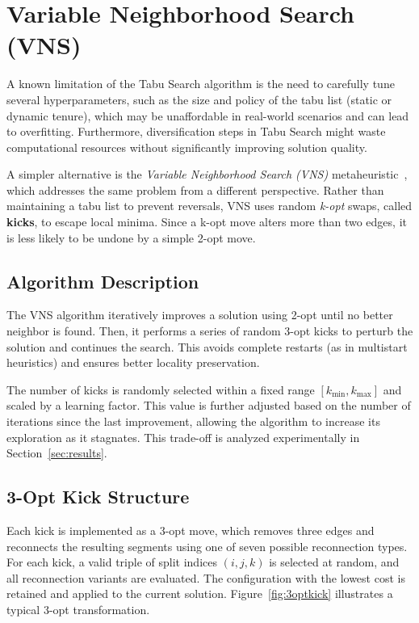\clearpage

\section{Variable Neighborhood Search (VNS)}

A known limitation of the Tabu Search algorithm is the need to carefully tune several hyperparameters, such as the size and policy 
of the tabu list (static or dynamic tenure), which may be unaffordable in real-world scenarios and can lead to overfitting. 
Furthermore, diversification steps in Tabu Search might waste computational resources without significantly improving solution quality.

A simpler alternative is the \textit{Variable Neighborhood Search (VNS)} metaheuristic~\cite{Hansen2009}, 
which addresses the same problem from a different perspective. Rather than maintaining a tabu list to prevent reversals, 
VNS uses random \textit{k-opt} swaps, called \textbf{kicks}, to escape local minima. Since a k-opt move alters more than two edges, 
it is less likely to be undone by a simple 2-opt move.

\subsection{Algorithm Description}

The VNS algorithm iteratively improves a solution using 2-opt until no better neighbor is found. Then, it performs a series of random 3-opt kicks 
to perturb the solution and continues the search. This avoids complete restarts (as in multistart heuristics) and ensures better locality preservation.

The number of kicks is randomly selected within a fixed range $[k_{\text{min}}, k_{\text{max}}]$ and scaled by a learning factor. 
This value is further adjusted based on the number of iterations since the last improvement, allowing the algorithm to increase its exploration 
as it stagnates. This trade-off is analyzed experimentally in Section~\ref{sec:results}.

\subsection{3-Opt Kick Structure}

Each kick is implemented as a 3-opt move, which removes three edges and reconnects the resulting segments using one of seven possible reconnection types. 
For each kick, a valid triple of split indices $(i, j, k)$ is selected at random, and all reconnection variants are evaluated. 
The configuration with the lowest cost is retained and applied to the current solution. Figure~\ref{fig:3optkick} illustrates a typical 3-opt transformation.

